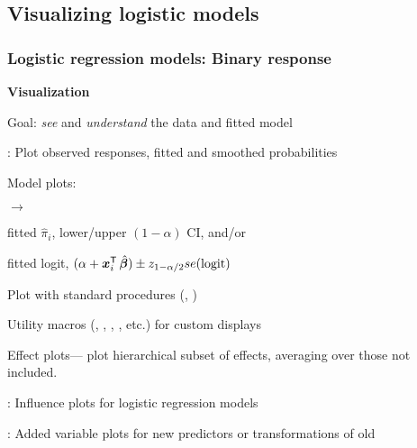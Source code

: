 \subsection{Visualizing logistic models}
\begin{frame}
  \frametitle{Logistic regression models: Binary response}
  \begin{block}{\large\bfseries Visualization}
    \begin{itemize*}
	  \item Goal: \emph{see} and \emph{understand} the data and fitted model
	  \item {}: Plot observed responses, fitted and smoothed probabilities
	  \item Model plots:
    	\begin{itemize*}
		    \item {} $\rightarrow$ 
    	   \begin{itemize*}
			    \item fitted $\hat{\pi}_i$, lower/upper $(1-\alpha)$ CI, and/or 
			    \item fitted logit, $(\alpha + \vec{x}_{i}\trans \,  \hat{\vec{\beta}}) \pm
			      z_{1-\alpha/2} se(\logit)$
    	   \end{itemize*}
			
		\item Plot with standard procedures (, )
		\item Utility macros (, , , , etc.)
		for custom displays
		\end{itemize*}
	  \item Effect plots--- plot hierarchical subset of effects, averaging over
	  those not included.
	  \item {}: Influence plots for logistic regression models
	  \item {}: Added variable plots for new predictors or transformations of old
	  \end{itemize*}
  \end{block}
\end{frame}


